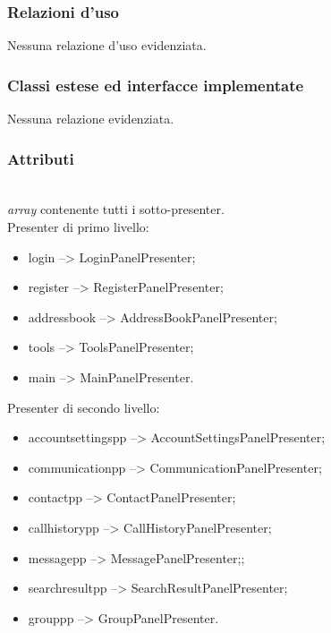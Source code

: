 \subsubsection*{Relazioni d'uso}
Nessuna relazione d'uso evidenziata.

\subsubsection*{Classi estese ed interfacce implementate}
Nessuna relazione evidenziata.

\subsubsection*{Attributi}
\begin{description}
\item{}\\
  \textit{array} contenente tutti i sotto-presenter.\\
  Presenter di primo livello:
  \begin{itemize}
  \item login --> LoginPanelPresenter;
  \item register --> RegisterPanelPresenter;
  \item addressbook --> AddressBookPanelPresenter;
  \item tools --> ToolsPanelPresenter;
  \item main --> MainPanelPresenter.
  \end{itemize}
  Presenter di secondo livello:
  \begin{itemize}
  \item accountsettingspp --> AccountSettingsPanelPresenter;
  \item communicationpp --> CommunicationPanelPresenter;
  \item contactpp --> ContactPanelPresenter;
  \item callhistorypp --> CallHistoryPanelPresenter;
  \item messagepp --> MessagePanelPresenter;;
  \item searchresultpp --> SearchResultPanelPresenter;
  \item grouppp --> GroupPanelPresenter.
  \end{itemize}
\end{description}

